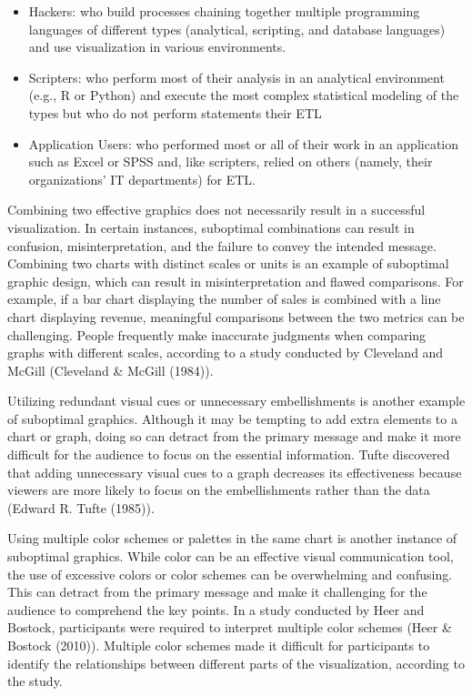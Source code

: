 \documentclass[print]{nuthesis}
\providecommand{\tightlist}{%
  \setlength{\itemsep}{0pt}\setlength{\parskip}{0pt}}
\begin{document}

\begin{itemize}
\tightlist
\item
  Hackers: who build processes chaining together multiple programming languages of different types (analytical, scripting, and database languages) and use visualization in various environments.
\item
  Scripters: who perform most of their analysis in an analytical environment (e.g., R or Python) and execute the most complex statistical modeling of the types but who do not perform statements their ETL
\item
  Application Users: who performed most or all of their work in an application such as Excel or SPSS and, like scripters, relied on others (namely, their organizations' IT departments) for ETL.
\end{itemize}

Combining two effective graphics does not necessarily result in a successful visualization.
In certain instances, suboptimal combinations can result in confusion, misinterpretation, and the failure to convey the intended message.
Combining two charts with distinct scales or units is an example of suboptimal graphic design, which can result in misinterpretation and flawed comparisons.
For example, if a bar chart displaying the number of sales is combined with a line chart displaying revenue, meaningful comparisons between the two metrics can be challenging.
People frequently make inaccurate judgments when comparing graphs with different scales, according to a study conducted by Cleveland and McGill (Cleveland \& McGill (1984)).

Utilizing redundant visual cues or unnecessary embellishments is another example of suboptimal graphics.
Although it may be tempting to add extra elements to a chart or graph, doing so can detract from the primary message and make it more difficult for the audience to focus on the essential information.
Tufte discovered that adding unnecessary visual cues to a graph decreases its effectiveness because viewers are more likely to focus on the embellishments rather than the data (Edward R. Tufte (1985)).

Using multiple color schemes or palettes in the same chart is another instance of suboptimal graphics.
While color can be an effective visual communication tool, the use of excessive colors or color schemes can be overwhelming and confusing.
This can detract from the primary message and make it challenging for the audience to comprehend the key points.
In a study conducted by Heer and Bostock, participants were required to interpret multiple color schemes (Heer \& Bostock (2010)).
Multiple color schemes made it difficult for participants to identify the relationships between different parts of the visualization, according to the study.
\end{document}
